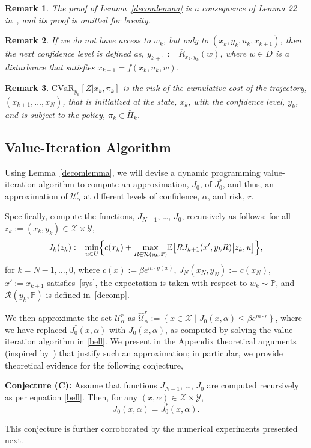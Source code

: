 \documentclass[letterpaper, 10 pt, conference]{ieeeconf}  %
\newtheorem{remark}{Remark}
\newcommand{\mpc}[1]{{\color{cyan} #1}}
\newcommand{\mpc}[1]{#1}
\begin{document}
\begin{remark}
The proof of Lemma~\ref{decomlemma} is a consequence of Lemma 22 in~\cite{pflug2016time}, and its proof is omitted for brevity. 
\end{remark}
%
%
%
\begin{remark}
If we do not have access to $w_k$, but only to $(x_k, y_k, u_k, x_{k+1})$, then the next confidence level is defined as, 
$y_{k+1} := \bar{R}_{x_k, y_k}(w)$, where $w \in D$ is a disturbance that satisfies $x_{k+1} = f(x_k, u_k, w)$.
\end{remark}
%
%
\begin{remark}
$\text{CVaR}_{y_k} [ Z | x_k, \pi_k ]$ is the risk of 
the cumulative cost of the trajectory, $(x_{k+1}, \dots, x_N)$, that is initialized at the state, $x_k$, 
with the confidence level, $y_k$, and is subject to the policy, $\pi_k \in \bar{\Pi}_k$.
\end{remark}

\subsection{Value-Iteration Algorithm}
Using Lemma~\ref{decomlemma}, we will devise a dynamic programming value-iteration algorithm to compute an approximation, $J_0$, of $J_0^*$, 
and thus, an approximation of $\mathcal{U}_\alpha^r$ %
at different levels of confidence, $\alpha$, and risk, $r$.

Specifically, compute the functions, $J_{N-1}$, \dots, $J_0$, recursively as follows: for all $z_k := (x_k, y_k) \in \mathcal{X} \times \mathcal{Y}$,
\begin{equation}
J_k(z_k) := {\underset{u \in U}\min} \Big\{ c(x_k) + {\underset{R \in \mathcal{R}(y_k, \mathbb{P})}\max} \mathbb{E}\big[ R J_{k+1}(x', y_k R) \big| z_k, u \big] \Big\}, \\
\label{bell}\end{equation}
for $k = N-1, \dots, 0$, where $c(x) := \beta e^{m \cdot g(x)}$, $J_N(x_N, y_N) := c(x_N)$, $x' := x_{k+1}$ satisfies~\eqref{sys}, 
the expectation is taken with respect to $w_k \sim \mathbb{P}$, and $\mathcal{R}(y_k, \mathbb{P})$ is defined in~\eqref{decomp}. 
\mpc{We then approximate the set $\mathcal{U}_{\alpha}^r$ as $\widehat{\mathcal{U}}_{\alpha}^r := \left\{ x \in \mathcal{X} \mid J_0(x, \alpha) \leq \beta e^{m \cdot r}\right\}$, where we have replaced $J_0^*(x, \alpha)$ with $J_0(x, \alpha)$, as computed by solving the value iteration algorithm in \eqref{bell}. We present in the Appendix theoretical arguments (inspired by~\cite{chow2015risk}) that justify such an approximation; in particular, we provide theoretical evidence for the following conjecture,  

{\bf Conjecture (C):}
Assume that functions $J_{N-1}$, \dots, $J_0$ are computed recursively as per equation \eqref{bell}.  Then, for any $(x, \alpha) \in \mathcal{X} \times \mathcal{Y}$,
\begin{equation}
\label{thm:eq}
J_0(x,\alpha) = J_0^*(x, \alpha).
\end{equation}

This conjecture is further corroborated by the numerical experiments presented next.
}
\end{document}
